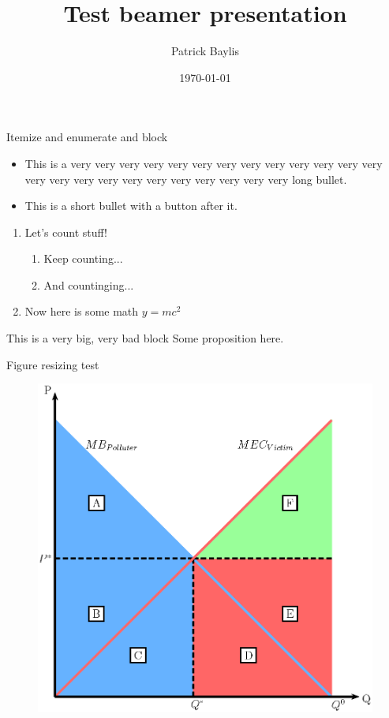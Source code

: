 \documentclass[11pt, aspectratio=169]{beamer}
\title{Test beamer presentation}
\author{Patrick Baylis \inst{1}}
\date[]{\today}
\institute{\inst{1} University of British Columbia}
\begin{document}
\begin{frame}
	\titlepage
\end{frame}

\begin{frame}{Itemize and enumerate and block }
	\begin{itemize}
		\item This is a very very very very very very very very very very very very very very very very very very very very very very very very long bullet.
		\item This is a short bullet with a button after it. 
	\end{itemize}
	\begin{enumerate}
		\item Let's count stuff!
		\begin{enumerate}
			\item Keep counting...
			\item And countinging...
		\end{enumerate}
		\item Now here is some math $y = mc^2$
	\end{enumerate}
	\begin{block}{This is a very big, very bad block}
		Some proposition here.
	\end{block}
\end{frame}

\begin{frame}{Figure resizing test}
	\begin{figure}
		\begin{adjustbox}{width=\textwidth, totalheight=\baselineskip,keepaspectratio}
			\includegraphics{img/figure1.png}
		\end{adjustbox}
	\end{figure}
\end{frame}
\end{document}
